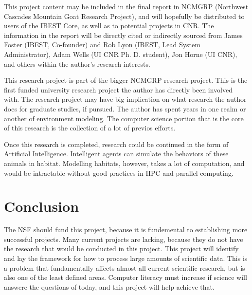 This project content may be included in the final report
in NCMGRP (Northwest Cascades Mountain Goat Research Project), and will 
hopefully be distributed to users of the IBEST Core, as well as to potential 
projects in CNR. The information in the report will be directly cited or 
indirectly sourced from James Foster (IBEST, Co-founder) and Rob Lyon (IBEST,
Lead System Administrator), Adam Wells (UI CNR Ph. D. student), Jon Horne 
(UI CNR), and others within the author's research interests.

This research project is part of the bigger NCMGRP research project. This is
the first funded university research project the author has directly been 
involved with. The research project may have big implication on what research
the author does for graduate studies, if pursued. The author has spent years 
in one realm or another of environment modeling. The computer science 
portion that is the core of this research is the collection of a lot of previos
efforts.

Once this research is completed, research could be continued in the form of 
Artificial Intelligence. Intelligent agents can simulate the behaviors of these
animals in habitat. Modelling habitats, however, takes a lot of computation,
and would be intractable without good practices in HPC and parallel computing.


\section{Conclusion}
The NSF should fund this project, because it is fundemental to establishing 
more successful projects. Many current projects are lacking, because they do
not have the research that would be conducted in this project. This project
will identify and lay the framework for how to process large amounts of 
scientific data. This is a problem that fundamentally affects almost all
current scientific research, but is also one of the least defined areas.
Computer literacy must increase if science will answere the questions of today,
and this project will help achieve that.






